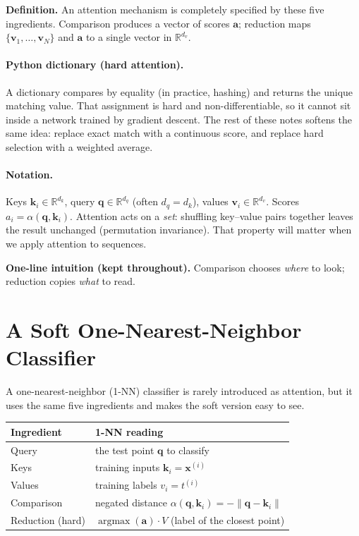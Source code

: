 \documentclass[11pt]{article}
\begin{document}
\noindent\textbf{Definition.}
An attention mechanism is completely specified by these five ingredients.
Comparison produces a vector of scores \(\mathbf{a}\); reduction maps
\(\{\mathbf{v}_1,\ldots,\mathbf{v}_N\}\) and \(\mathbf{a}\) to a single
vector in \(\mathbb{R}^{d_v}\).

\paragraph{Python dictionary (hard attention).}
A dictionary compares by equality (in practice, hashing) and returns the
unique matching value. That assignment is hard and non-differentiable, so
it cannot sit inside a network trained by gradient descent. The rest of
these notes softens the same idea: replace exact match with a continuous
score, and replace hard selection with a weighted average.

\paragraph{Notation.}
Keys \(\mathbf{k}_i\in\mathbb{R}^{d_k}\), query \(\mathbf{q}\in\mathbb{R}^{d_q}\)
(often \(d_q=d_k\)), values \(\mathbf{v}_i\in\mathbb{R}^{d_v}\). Scores
\(a_i=\alpha(\mathbf{q},\mathbf{k}_i)\). Attention acts on a \emph{set}:
shuffling key--value pairs together leaves the result unchanged
(permutation invariance). That property will matter when we apply attention
to sequences.

\noindent\textbf{One-line intuition (kept throughout).}
Comparison chooses \emph{where} to look; reduction copies \emph{what} to
read.

\section{A Soft One-Nearest-Neighbor Classifier}

A one-nearest-neighbor (1-NN) classifier is rarely introduced as attention,
but it uses the same five ingredients and makes the soft version easy to
see.

\begin{center}
\begin{tabular}{@{}ll@{}}
\toprule
Ingredient & 1-NN reading \\
\midrule
Query  & the test point \(\mathbf{q}\) to classify \\
Keys   & training inputs \(\mathbf{k}_i=\mathbf{x}^{(i)}\) \\
Values & training labels \(v_i=t^{(i)}\) \\
Comparison & negated distance
  \(\alpha(\mathbf{q},\mathbf{k}_i)=-\lVert\mathbf{q}-\mathbf{k}_i\rVert\) \\
Reduction (hard) & \(\operatorname{argmax}(\mathbf{a})\cdot V\)
  (label of the closest point) \\
\bottomrule
\end{tabular}
\end{center}
\end{document}
